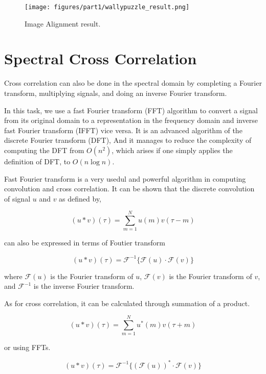 \begin{figure}[h!]
	\centering
		\texttt{[image: figures/part1/wallypuzzle\_result.png]}
		\caption{Image Alignment result. }
		\label{fig:maze-b}
\end{figure} 

\section{Spectral Cross Correlation}

Cross correlation can also be done in the spectral domain by completing a Fourier transform, multiplying signals, and doing an inverse Fourier transform.

In this task, we use a fast Fourier transform (FFT) algorithm to convert a signal from its original domain to a representation in the frequency domain and inverse fast Fourier transform (IFFT) vice versa. It is an advanced algorithm of the discrete Fourier transform (DFT), And it manages to reduce the complexity of computing the DFT from $O(n^2)$, which arises if one simply applies the definition of DFT, to $O(n\log n)$.

Fast Fourier transform is a very usedul and powerful algorithm in computing convolution and cross correlation. It can be shown that the discrete convolution of signal $u$ and $v$ as defined by,

\begin{equation*}
(u*v)(\tau)=\sum_{m=1}^{N}u(m)v(\tau-m)
\end{equation*}

can also be expressed in terms of Foutier transform

\begin{equation*}
(u*v)(\tau)=\mathcal{F}^{-1}\{\mathcal{F}(u)\cdot \mathcal{F}(v)\}
\end{equation*}

where $\mathcal{F}(u)$ is the Fourier transform of $u$, $\mathcal{F}(v)$ is the Fourier transform of $v$, and $\mathcal{F}^{-1}$ is the inverse Fourier transform.

As for cross correlation, it can be calculated through summation of a product.

\begin{equation*}
(u*v)(\tau)=\sum_{m=1}^{N}u^*(m)v(\tau+m)
\end{equation*}

or using FFTs.

\begin{equation*}
	(u*v)(\tau)=\mathcal{F}^{-1}\{(\mathcal{F}(u))^{*}\cdot \mathcal{F}(v)\}
\end{equation*}

